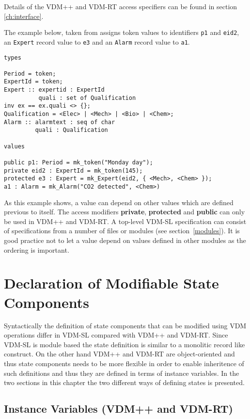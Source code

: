 \documentclass{overturerepchap}
\newcommand{\keyw}[1]{{\bf\ttfamily #1}}
\begin{document}
{\begin{description}
Details of the VDM++ and VDM-RT access specifiers
can be found in section \ref{ch:interface}.

\item[Examples:] The example below, taken from \cite{Fitzgerald&98}
  assigns token values to identifiers
  \texttt{p1} and \texttt{eid2}, an \texttt{Expert} record value to
  \texttt{e3} and an \texttt{Alarm} record value to \texttt{a1}.
\begin{lstlisting}
types

Period = token;
ExpertId = token;
Expert :: expertid : ExpertId
          quali : set of Qualification
inv ex == ex.quali <> {};
Qualification = <Elec> | <Mech> | <Bio> | <Chem>;
Alarm :: alarmtext : seq of char
         quali : Qualification

values

public p1: Period = mk_token("Monday day");
private eid2 : ExpertId = mk_token(145);
protected e3 : Expert = mk_Expert(eid2, { <Mech>, <Chem> });
a1 : Alarm = mk_Alarm("CO2 detected", <Chem>)
\end{lstlisting}
  As this example shows, a value can depend on other values which are
  defined previous to itself. The access modifiers \keyw{private},
  \keyw{protected} and \keyw{public} can only be used in VDM++ and VDM-RT.
  A top-level VDM-SL specification can consist of
  specifications from a number of files or modules (see
  section~\ref{modules}).  It is good practice not to let a value depend
  on values defined in other modules as the ordering is important.
\end{description}

\chapter{Declaration of Modifiable State Components}\label{chap:state}

Syntactically the definition of state components that can be modified
using VDM operations differ in VDM-SL compared with VDM++ and
VDM-RT. Since VDM-SL is module based the state definition is similar
to a monolitic record like construct. On the other hand VDM++ and
VDM-RT are object-oriented and thus state components needs to be more
flexible in order to enable inheritence of such definitions and thus
they are defined in terms of instance variables. In the two sections
in this chapter the two different ways of defining states is presented.

\section{Instance Variables (VDM++ and VDM-RT)}
\label{sec:ivars}

}
\end{document}
